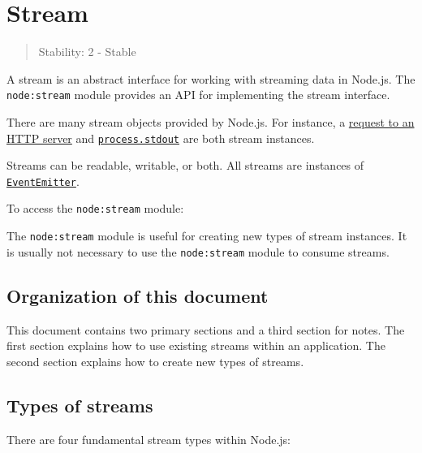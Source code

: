 \section{Stream}\label{stream}

\begin{quote}
Stability: 2 - Stable
\end{quote}

A stream is an abstract interface for working with streaming data in
Node.js. The \texttt{node:stream} module provides an API for
implementing the stream interface.

There are many stream objects provided by Node.js. For instance, a
\href{http.md\#class-httpincomingmessage}{request to an HTTP server} and
\href{process.md\#processstdout}{\texttt{process.stdout}} are both
stream instances.

Streams can be readable, writable, or both. All streams are instances of
\href{events.md\#class-eventemitter}{\texttt{EventEmitter}}.

To access the \texttt{node:stream} module:

\begin{Shaded}
\begin{Highlighting}[]
\OperatorTok{=} \NormalTok{(}\NormalTok{)}\OperatorTok{;}
\end{Highlighting}
\end{Shaded}

The \texttt{node:stream} module is useful for creating new types of
stream instances. It is usually not necessary to use the
\texttt{node:stream} module to consume streams.

\subsection{Organization of this
document}\label{organization-of-this-document}

This document contains two primary sections and a third section for
notes. The first section explains how to use existing streams within an
application. The second section explains how to create new types of
streams.

\subsection{Types of streams}\label{types-of-streams}

There are four fundamental stream types within Node.js:

